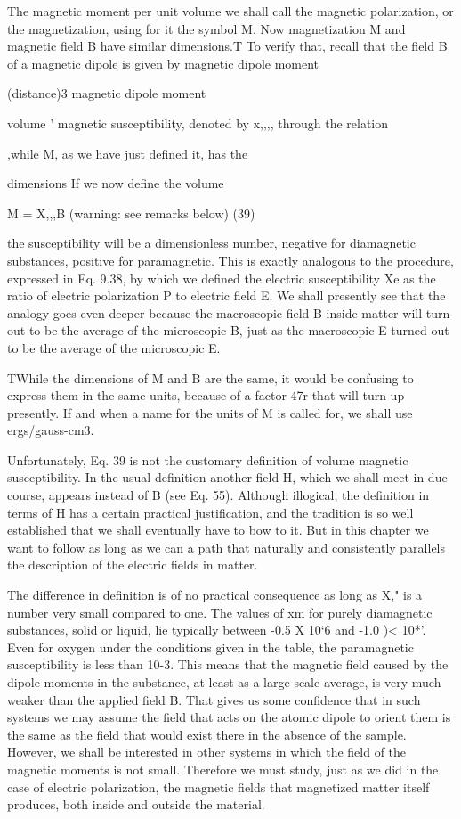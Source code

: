 The magnetic moment per unit volume we shall call the magnetic
polarization, or the magnetization, using for it the symbol M. Now
magnetization M and magnetic field B have similar dimensions.T
To verify that, recall that the field B of a magnetic dipole is given by
magnetic dipole moment

\begin{equation}
\end{equation}
(distance)3
magnetic dipole moment

volume '
magnetic susceptibility, denoted by x,,,, through the relation

,while M, as we have just defined it, has the

dimensions If we now define the volume

M = X,,,B (warning: see remarks below) (39)

the susceptibility will be a dimensionless number, negative for 
diamagnetic substances, positive for paramagnetic. This is exactly
analogous to the procedure, expressed in Eq. 9.38, by which we
defined the electric susceptibility Xe as the ratio of electric polarization
P to electric field E. We shall presently see that the analogy goes
even deeper because the macroscopic field B inside matter will turn
out to be the average of the microscopic B, just as the macroscopic E
turned out to be the average of the microscopic E.

TWhile the dimensions of M and B are the same, it would be confusing to express
them in the same units, because of a factor 47r that will turn up presently. If and
when a name for the units of M is called for, we shall use ergs/gauss-cm3.

Unfortunately, Eq. 39 is not the customary definition of volume
magnetic susceptibility. In the usual definition another field H,
which we shall meet in due course, appears instead of B (see Eq. 55).
Although illogical, the definition in terms of H has a certain practical
justification, and the tradition is so well established that we shall
eventually have to bow to it. But in this chapter we want to follow
as long as we can a path that naturally and consistently parallels the
description of the electric fields in matter.

The difference in definition is of no practical consequence as long
as X," is a number very small compared to one. The values of xm
for purely diamagnetic substances, solid or liquid, lie typically between
-0.5 X 10‘6 and -1.0 )< 10*'. Even for oxygen under the
conditions given in the table, the paramagnetic susceptibility is less
than 10-3. This means that the magnetic field caused by the dipole
moments in the substance, at least as a large-scale average, is very
much weaker than the applied field B. That gives us some confidence
that in such systems we may assume the field that acts on the
atomic dipole to orient them is the same as the field that would exist
there in the absence of the sample. However, we shall be interested
in other systems in which the field of the magnetic moments is not
small. Therefore we must study, just as we did in the case of electric
polarization, the magnetic fields that magnetized matter itself 
produces, both inside and outside the material.

